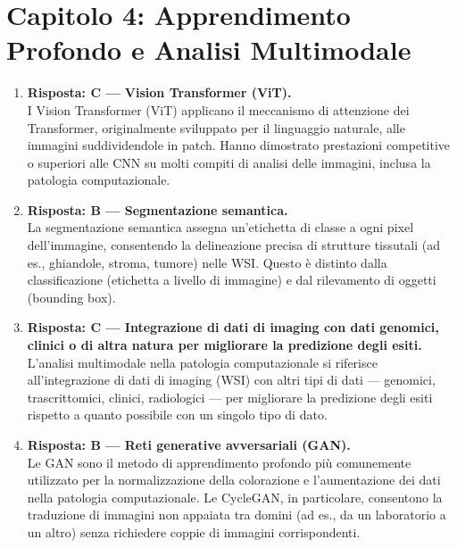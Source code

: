 \section*{Capitolo 4: Apprendimento Profondo e Analisi Multimodale}

\begin{enumerate}

    \item \textbf{Risposta: C --- Vision Transformer (ViT).}\\
    I Vision Transformer (ViT) applicano il meccanismo di attenzione dei Transformer, originalmente
    sviluppato per il linguaggio naturale, alle immagini suddividendole in patch. Hanno dimostrato
    prestazioni competitive o superiori alle CNN su molti compiti di analisi delle immagini,
    inclusa la patologia computazionale.

    \item \textbf{Risposta: B --- Segmentazione semantica.}\\
    La segmentazione semantica assegna un'etichetta di classe a ogni pixel dell'immagine,
    consentendo la delineazione precisa di strutture tissutali (ad es., ghiandole, stroma, tumore)
    nelle WSI. Questo è distinto dalla classificazione (etichetta a livello di immagine) e dal
    rilevamento di oggetti (bounding box).

    \item \textbf{Risposta: C --- Integrazione di dati di imaging con dati genomici, clinici o
    di altra natura per migliorare la predizione degli esiti.}\\
    L'analisi multimodale nella patologia computazionale si riferisce all'integrazione di dati di
    imaging (WSI) con altri tipi di dati --- genomici, trascrittomici, clinici, radiologici ---
    per migliorare la predizione degli esiti rispetto a quanto possibile con un singolo tipo di
    dato.

    \item \textbf{Risposta: B --- Reti generative avversariali (GAN).}\\
    Le GAN sono il metodo di apprendimento profondo più comunemente utilizzato per la
    normalizzazione della colorazione e l'aumentazione dei dati nella patologia computazionale.
    Le CycleGAN, in particolare, consentono la traduzione di immagini non appaiata tra domini
    (ad es., da un laboratorio a un altro) senza richiedere coppie di immagini corrispondenti.


\end{enumerate}
